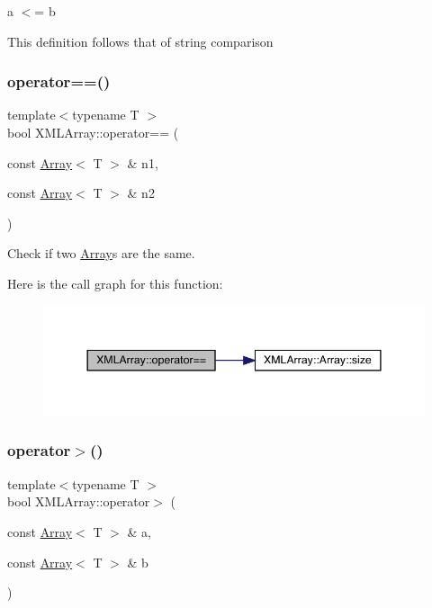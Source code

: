 a $<$= b 

This definition follows that of string comparison \mbox{\label{namespaceXMLArray_a832b56f8c7a9d6415cadd0d6e60635f1}} 
\subsubsection{\texorpdfstring{operator==()}{operator==()}}
{\footnotesize\ttfamily template$<$typename T $>$ \\
bool X\+M\+L\+Array\+::operator== (\begin{DoxyParamCaption}\item[{const \mbox{\hyperlink{classXMLArray_1_1Array}{Array}}$<$ T $>$ \&}]{n1,  }\item[{const \mbox{\hyperlink{classXMLArray_1_1Array}{Array}}$<$ T $>$ \&}]{n2 }\end{DoxyParamCaption})\hspace{0.3cm}{\ttfamily [inline]}}



Check if two \mbox{\hyperlink{classXMLArray_1_1Array}{Array}}\textquotesingle{}s are the same. 

Here is the call graph for this function\+:\nopagebreak
\begin{figure}[H]
\begin{center}
\leavevmode
\includegraphics[width=344pt]{dd/db1/namespaceXMLArray_a832b56f8c7a9d6415cadd0d6e60635f1_cgraph}
\end{center}
\end{figure}
\mbox{\label{namespaceXMLArray_ad9684cbf7b3089e446a523042d2818c1}} 
\subsubsection{\texorpdfstring{operator$>$()}{operator>()}}
{\footnotesize\ttfamily template$<$typename T $>$ \\
bool X\+M\+L\+Array\+::operator$>$ (\begin{DoxyParamCaption}\item[{const \mbox{\hyperlink{classXMLArray_1_1Array}{Array}}$<$ T $>$ \&}]{a,  }\item[{const \mbox{\hyperlink{classXMLArray_1_1Array}{Array}}$<$ T $>$ \&}]{b }\end{DoxyParamCaption})\hspace{0.3cm}{\ttfamily [inline]}}



